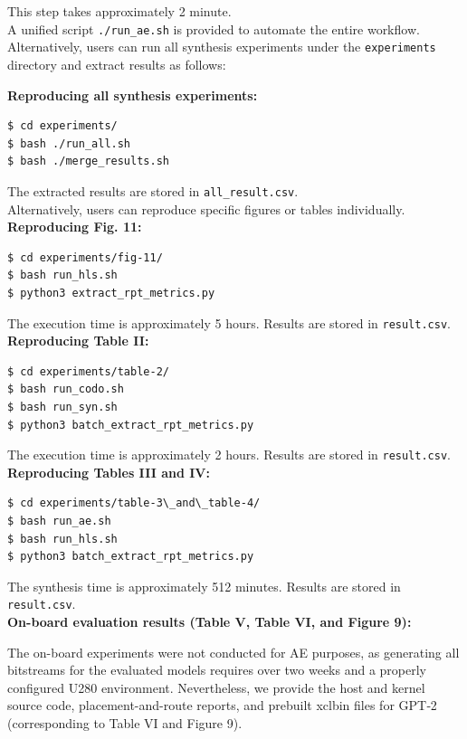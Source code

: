\documentclass[conference]{IEEEtran}
\begin{document}
\noindent This step takes approximately 2 minute.\\

A unified script \texttt{./run\_ae.sh} is provided to automate the entire workflow. Alternatively, users can run all synthesis experiments under the \texttt{experiments} directory and extract results as follows:

\textbf{Reproducing all synthesis experiments:}
\begin{lstlisting}[language=bash]
$ cd experiments/
$ bash ./run_all.sh
$ bash ./merge_results.sh
\end{lstlisting}
The extracted results are stored in \texttt{all\_result.csv}.\\

Alternatively, users can reproduce specific figures or tables individually. \\

\textbf{Reproducing Fig. 11:}
\begin{lstlisting}[language=bash]
$ cd experiments/fig-11/
$ bash run_hls.sh
$ python3 extract_rpt_metrics.py
\end{lstlisting}
The execution time is approximately 5 hours. Results are stored in \texttt{result.csv}.\\

\textbf{Reproducing Table II:}
\begin{lstlisting}[language=bash]
$ cd experiments/table-2/
$ bash run_codo.sh
$ bash run_syn.sh
$ python3 batch_extract_rpt_metrics.py
\end{lstlisting}
The execution time is approximately 2 hours. Results are stored in \texttt{result.csv}.\\

\textbf{Reproducing Tables III and IV:}
\begin{lstlisting}[language=bash]
$ cd experiments/table-3\_and\_table-4/
$ bash run_ae.sh
$ bash run_hls.sh
$ python3 batch_extract_rpt_metrics.py
\end{lstlisting}
The synthesis time is approximately 512 minutes. Results are stored in \texttt{result.csv}.\\


\textbf{On-board evaluation results (Table V, Table VI, and Figure 9):} 

The on-board experiments were not conducted for AE purposes, as generating all bitstreams for the evaluated models requires over two weeks and a properly configured U280 environment. Nevertheless, we provide the host and kernel source code, placement-and-route reports, and prebuilt xclbin files for GPT‑2 (corresponding to Table VI and Figure 9).
\end{document}
